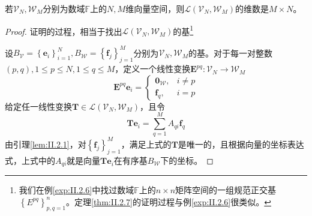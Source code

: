 \documentclass[main.tex]{subfiles}
\begin{document}
\begin{theorem}\label{thm:II.2.7}
    若$\mathcal{V}_N,\mathcal{W}_M$分别为数域$\mathbb{F}$上的$N,M$维向量空间，则$\mathcal{L}\left(\mathcal{V}_N,\mathcal{W}_M\right)$的维数是$M\times N$。
\end{theorem}
\begin{proof}
    证明的过程，相当于找出$\mathcal{L}\left(\mathcal{V}_N,\mathcal{W}_M\right)$的基\footnote{我们在例\ref{exp:II.2.6}中找过数域$\mathbb{F}$上的$n\times n$矩阵空间的一组规范正交基$\left\{E^{pq}\right\}_{p,q=1}^n$。定理\ref{thm:II.2.7}的证明过程与例\ref{exp:II.2.6}很类似。}

    设$B_{\mathcal{V}}=\left\{\mathbf{e}_i\right\}_{i=1}^N,B_{\mathcal{W}}=\left\{\mathbf{f}_j\right\}_{j=1}^M$分别为$\mathcal{V}_N,\mathcal{W}_M$的基。对于每一对整数$\left(p,q\right),1\leq p\leq N,1\leq q\leq M$，定义一个线性变换$\mathbf{E}^{pq}:\mathcal{V}_N\rightarrow\mathcal{W}_M$
    \[
        \mathbf{E}^{pq}\mathbf{e}_i=\left\{\begin{array}{cc}
            \mathbf{0}_{\mathcal{W}}, & i\neq p \\
            \mathbf{f}_q,             & i=p
        \end{array}\right.
    \]
    给定任一线性变换$\mathbf{T}\in\mathcal{L}\left(\mathcal{V}_N,\mathcal{W}_M\right)$，且令
    \[\mathbf{Te}_i=\sum_{q=1}^MA_{qi}\mathbf{f}_q\]
    由引理\ref{lem:II.2.1}，对$\left\{\mathbf{f}_j\right\}_{j=1}^M$，满足上式的$\mathbf{T}$是唯一的，且根据向量的坐标表达式，上式中的$A_{qi}$就是向量$\mathbf{Te}_i$在有序基$B_{\mathcal{W}}$下的坐标。


\end{proof}
\end{document}
